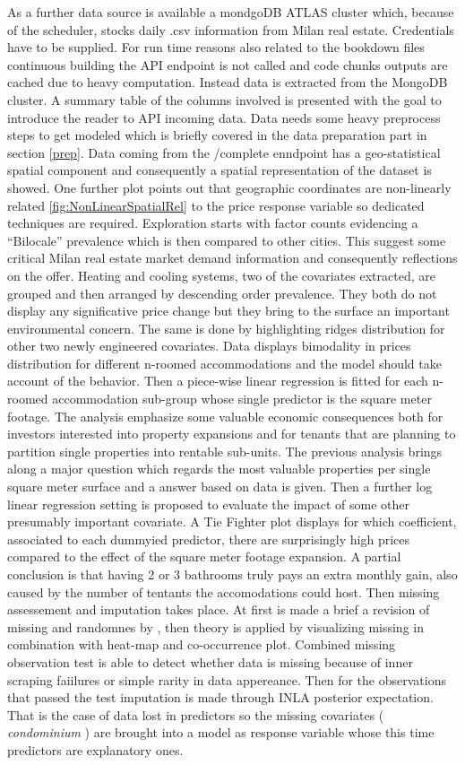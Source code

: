 \documentclass[
  12pt,
  a4paper,
  oneside]{book}
\theoremstyle{definition}
\theoremstyle{definition}
\theoremstyle{definition}
\theoremstyle{remark}
\begin{document}
As a further data source is available a mondgoDB ATLAS cluster which, because of the scheduler, stocks daily .csv information from Milan real estate. Credentials have to be supplied. For run time reasons also related to the bookdown files continuous building the API endpoint is not called and code chunks outputs are cached due to heavy computation. Instead data is extracted from the MongoDB cluster. A summary table of the columns involved is presented with the goal to introduce the reader to API incoming data. Data needs some heavy preprocess steps to get modeled which is briefly covered in the data preparation part in section \ref{prep}. Data coming from the /complete enndpoint has a geo-statistical spatial component and consequently a spatial representation of the dataset is showed. One further plot points out that geographic coordinates are non-linearly related \ref{fig:NonLinearSpatialRel} to the price response variable so dedicated techniques are required. Exploration starts with factor counts evidencing a ``Bilocale'' prevalence which is then compared to other cities. This suggest some critical Milan real estate market demand information and consequently reflections on the offer. Heating and cooling systems, two of the covariates extracted, are grouped and then arranged by descending order prevalence. They both do not display any significative price change but they bring to the surface an important environmental concern. The same is done by highlighting ridges distribution for other two newly engineered covariates. Data displays bimodality in prices distribution for different n-roomed accommodations and the model should take account of the behavior. Then a piece-wise linear regression is fitted for each n-roomed accommodation sub-group whose single predictor is the square meter footage. The analysis emphasize some valuable economic consequences both for investors interested into property expansions and for tenants that are planning to partition single properties into rentable sub-units. The previous analysis brings along a major question which regards the most valuable properties per single square meter surface and a answer based on data is given. Then a further log linear regression setting is proposed to evaluate the impact of some other presumably important covariate. A Tie Fighter plot displays for which coefficient, associated to each dummyied predictor, there are surprisingly high prices compared to the effect of the square meter footage expansion. A partial conclusion is that having 2 or 3 bathrooms truly pays an extra monthly gain, also caused by the number of tentants the accomodations could host. Then missing assessement and imputation takes place. At first is made a brief a revision of missing and randomnes by \citet{Little}, then theory is applied by visualizing missing in combination with heat-map and co-occurrence plot. Combined missing observation test is able to detect whether data is missing because of inner scraping faiilures or simple rarity in data appereance. Then for the observations that passed the test imputation is made through INLA posterior expectation. That is the case of data lost in predictors so the missing covariates ( \emph{condominium} ) are brought into a model as response variable whose this time predictors are explanatory ones. 
\end{document}
